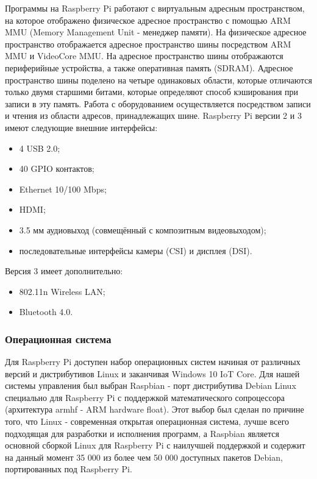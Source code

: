 \documentclass[14pt,russian,a4paper]{extarticle}
\begin{document}
Программы на Raspberry Pi работают с виртуальным адресным пространством, на которое отображено физическое адресное пространство с помощью ARM MMU (Memory Management Unit - менеджер памяти). На физическое адресное пространство отображается адресное пространство шины посредством ARM MMU и VideoCore MMU. На адресное пространство шины отображаются периферийные устройства, а также оперативная память (SDRAM). Адресное пространство шины поделено на четыре одинаковых области, которые отличаются только двумя старшими битами, которые определяют способ кэширования при записи в эту память. Работа с оборудованием осуществляется посредством записи и чтения из области адресов, принадлежащих шине.
Raspberry Pi версии 2 и 3 имеют следующие внешние интерфейсы:
\begin{itemize}
    \item 4 USB 2.0;
    \item 40 GPIO контактов;
    \item Ethernet 10/100 Mbps;
    \item HDMI;
    \item 3.5 мм аудиовыход (совмещённый с композитным видеовыходом);
    \item последовательные интерфейсы камеры (CSI) и дисплея (DSI).
\end{itemize}
Версия 3 имеет дополнительно:
\begin{itemize}
    \item 802.11n Wireless LAN;
    \item Bluetooth 4.0.
\end{itemize}

\subsubsection{Операционная система}
Для Raspberry Pi доступен набор операционных систем начиная от различных версий и дистрибутивов Linux и заканчивая Windows 10 IoT Core. Для нашей системы управления был выбран Raspbian\cite{raspbian} - порт дистрибутива Debian Linux специально для Raspberry Pi с поддержкой математического сопроцессора (архитектура armhf - ARM hardware float). Этот выбор был сделан по причине того, что Linux - современная открытая операционная система, лучше всего подходящая для разработки и исполнения программ, а Raspbian является основной сборкой Linux для Raspberry Pi с наилучшей поддержкой и содержит на данный момент 35 000 из более чем 50 000 доступных пакетов Debian, портированных под Raspberry Pi.
\end{document}

